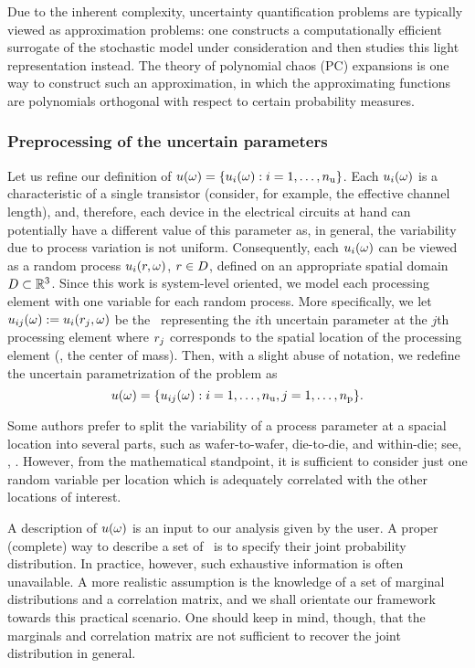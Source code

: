 Due to the inherent complexity, uncertainty quantification problems are typically viewed as approximation problems: one constructs a computationally efficient surrogate of the stochastic model under consideration and then studies this light representation instead.
The theory of polynomial chaos (PC) expansions \cite{maitre2010} is one way to construct such an approximation, in which the approximating functions are polynomials orthogonal with respect to certain probability measures.

\subsubsection{Preprocessing of the uncertain parameters}
Let us refine our definition of $u(\omega) = \{ u_i(\omega): i = 1, \dots, {n_\text{u}} \}$.
Each $u_i(\omega)$ is a characteristic of a single transistor (consider, for example, the effective channel length), and, therefore, each device in the electrical circuits at hand can potentially have a different value of this parameter as, in general, the variability due to process variation is not uniform.
Consequently, each $u_i(\omega)$ can be viewed as a random process $u_i(r, \omega)$, $r \in D$, defined on an appropriate spatial domain $D \subset \mathbb{R}^3$.
Since this work is system-level oriented, we model each processing element with one variable for each random process.
More specifically, we let $u_{ij}(\omega) := u_i(r_j, \omega)$ be the \rv\ representing the $i$th uncertain parameter at the $j$th processing element where $r_j$ corresponds to the spatial location of the processing element (\eg, the center of mass).
Then, with a slight abuse of notation, we redefine the uncertain parametrization of the problem as
\[
  u(\omega) = \{ u_{ij}(\omega): i = 1, \dots, {n_\text{u}}, j = 1, \dots, {n_\text{p}} \}.
\]
\begin{remark}
Some authors prefer to split the variability of a process parameter at a spacial location into several parts, such as wafer-to-wafer, die-to-die, and within-die; see, \eg, \cite{juan2012}.
However, from the mathematical standpoint, it is sufficient to consider just one random variable per location which is adequately correlated with the other locations of interest.
\end{remark}

A description of $u(\omega)$ is an input to our analysis given by the user.
A proper (complete) way to describe a set of \rvs\ is to specify their joint probability distribution.
In practice, however, such exhaustive information is often unavailable.
A more realistic assumption is the knowledge of a set of marginal distributions and a correlation matrix, and we shall orientate our framework towards this practical scenario.
One should keep in mind, though, that the marginals and correlation matrix are not sufficient to recover the joint distribution in general.

